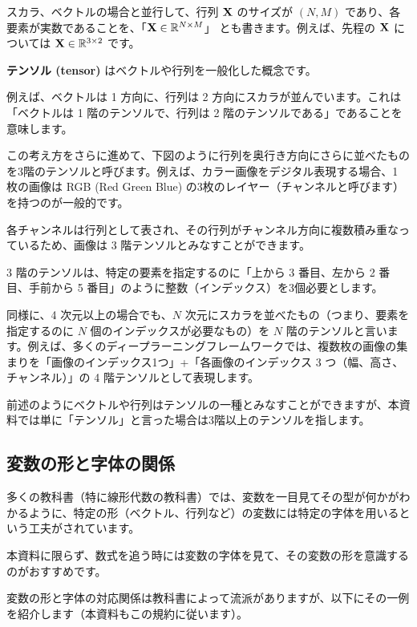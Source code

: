 スカラ、ベクトルの場合と並行して、行列 ${\bf X}$ のサイズが $(N, M)$ であり、各要素が実数であることを、「${\bf X} \in \mathbb{R}^{N \times M}$」 とも書きます。例えば、先程の ${\bf X}$ については ${\bf X}\in \mathbb{R}^{3\times 2}$ です。



\textbf{テンソル (tensor)} はベクトルや行列を一般化した概念です。

例えば、ベクトルは 1 方向に、行列は 2 方向にスカラが並んでいます。これは「ベクトルは 1 階のテンソルで、行列は 2 階のテンソルである」であることを意味します。

この考え方をさらに進めて、下図のように行列を奥行き方向にさらに並べたものを3階のテンソルと呼びます。例えば、カラー画像をデジタル表現する場合、1 枚の画像は RGB (Red Green Blue) の3枚のレイヤー（チャンネルと呼びます）を持つのが一般的です。

各チャンネルは行列として表され、その行列がチャンネル方向に複数積み重なっているため、画像は 3 階テンソルとみなすことができます。

3 階のテンソルは、特定の要素を指定するのに「上から 3 番目、左から 2 番目、手前から 5 番目」のように整数（インデックス）を3個必要とします。


同様に、4 次元以上の場合でも、$N$ 次元にスカラを並べたもの（つまり、要素を指定するのに $N$ 個のインデックスが必要なもの）を $N$ 階のテンソルと言います。例えば、多くのディープラーニングフレームワークでは、複数枚の画像の集まりを「画像のインデックス1つ」+「各画像のインデックス 3 つ（幅、高さ、チャンネル）」の 4 階テンソルとして表現します。

前述のようにベクトルや行列はテンソルの一種とみなすことができますが、本資料では単に「テンソル」と言った場合は3階以上のテンソルを指します。





\subsection{変数の形と字体の関係}


多くの教科書（特に線形代数の教科書）では、変数を一目見てその型が何かがわかるように、特定の形（ベクトル、行列など）の変数には特定の字体を用いるという工夫がされています。

本資料に限らず、数式を追う時には変数の字体を見て、その変数の形を意識するのがおすすめです。

変数の形と字体の対応関係は教科書によって流派がありますが、以下にその一例を紹介します（本資料もこの規約に従います）。


